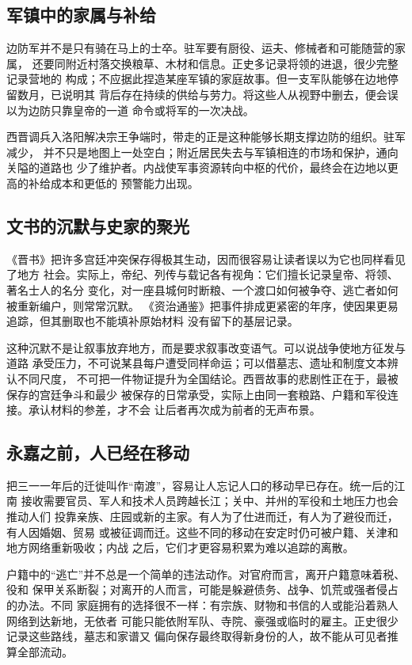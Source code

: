 \subsection{军镇中的家属与补给}

边防军并不是只有骑在马上的士卒。驻军要有厨役、运夫、修械者和可能随营的家属，
还要同附近村落交换粮草、木材和信息。正史多记录将领的进退，很少完整记录营地的
构成；不应据此捏造某座军镇的家庭故事。但一支军队能够在边地停留数月，已说明其
背后存在持续的供给与劳力。将这些人从视野中删去，便会误以为边防只靠皇帝的一道
命令或将军的一次决战。

西晋调兵入洛阳解决宗王争端时，带走的正是这种能够长期支撑边防的组织。驻军减少，
并不只是地图上一处空白；附近居民失去与军镇相连的市场和保护，通向关隘的道路也
少了维护者。内战使军事资源转向中枢的代价，最终会在边地以更高的补给成本和更低的
预警能力出现。

\subsection{文书的沉默与史家的聚光}

《晋书》把许多宫廷冲突保存得极其生动，因而很容易让读者误以为它也同样看见了地方
社会。实际上，帝纪、列传与载记各有视角：它们擅长记录皇帝、将领、著名士人的名分
变化，对一座县城何时断粮、一个渡口如何被争夺、逃亡者如何被重新编户，则常常沉默。
《资治通鉴》把事件排成更紧密的年序，使因果更易追踪，但其删取也不能填补原始材料
没有留下的基层记录。

这种沉默不是让叙事放弃地方，而是要求叙事改变语气。可以说战争使地方征发与道路
承受压力，不可说某县每户遭受同样命运；可以借墓志、遗址和制度文本辨认不同尺度，
不可把一件物证提升为全国结论。西晋故事的悲剧性正在于，最被保存的宫廷争斗和最少
被保存的日常承受，实际上由同一套粮路、户籍和军役连接。承认材料的参差，才不会
让后者再次成为前者的无声布景。

\subsection{永嘉之前，人已经在移动}

把三一一年后的迁徙叫作“南渡”，容易让人忘记人口的移动早已存在。统一后的江南
接收需要官员、军人和技术人员跨越长江；关中、并州的军役和土地压力也会推动人们
投靠亲族、庄园或新的主家。有人为了仕进而迁，有人为了避役而迁，有人因婚姻、贸易
或被征调而迁。这些不同的移动在安定时仍可被户籍、关津和地方网络重新吸收；内战
之后，它们才更容易积累为难以追踪的离散。

户籍中的“逃亡”并不总是一个简单的违法动作。对官府而言，离开户籍意味着税、役和
保甲关系断裂；对离开的人而言，可能是躲避债务、战争、饥荒或强者侵占的办法。不同
家庭拥有的选择很不一样：有宗族、财物和书信的人或能沿着熟人网络到达新地，无依者
可能只能依附军队、寺院、豪强或临时的雇主。正史很少记录这些路线，墓志和家谱又
偏向保存最终取得新身份的人，故不能从可见者推算全部流动。

